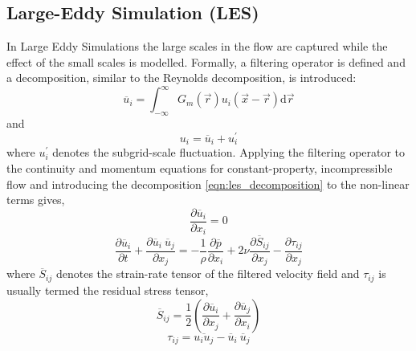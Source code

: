 \subsection{Large-Eddy Simulation (LES)}\label{sec:LES}
In Large Eddy Simulations the large scales in the flow are captured while the effect of the small scales
is modelled. Formally, a filtering operator is defined and a decomposition, similar to the Reynolds
decomposition, is introduced:
\begin{equation}
\overline{u}_i = \int_{-\infty}^\infty G_m\left( \overrightarrow{r} \right) u_i \left( \overrightarrow{x} - \overrightarrow{r} \right) \text{d} \overrightarrow{r}
\label{eqn:les_filtering}
\end{equation}
and
\begin{equation}
u_i = \overline{u}_i + u_i^\prime
\label{eqn:les_decomposition}
\end{equation}
where $u_i^\prime$ denotes the subgrid-scale fluctuation. Applying
the filtering operator to the continuity and momentum equations for constant-property, incompressible
flow and introducing the decomposition \eqref{eqn:les_decomposition} to the non-linear terms gives,
\begin{equation}
\frac{\partial \overline{u}_i}{\partial x_i} = 0
\label{eqn:filtered_continuity}
\end{equation}
\begin{equation}
\frac{\partial \overline{u}_i}{\partial t} + \frac{\partial \overline{u}_i \ \overline{u}_j}{\partial x_j} =
 -\frac 1 \rho \frac{\partial \overline{p}}{\partial x_i}
 + 2 \nu \frac{\partial \overline{S}_{ij}}{\partial x_j} - \frac{\partial \tau_{ij}}{\partial x_j}
\label{eqn:filtered_momentum}
\end{equation}
where $\overline{S}_{ij}$ denotes the strain-rate tensor of the filtered velocity field
and $\tau_{ij}$ is usually termed the residual stress tensor,
\begin{equation}
\overline{S}_{ij} = \frac 1 2 \left ( \frac{\partial \overline{u}_i}{\partial x_j} + \frac{\partial \overline{u}_j}{\partial x_i} \right )
\label{eqn:defin_strain_rate_tensor}
\end{equation}
\begin{equation}
\tau_{ij} = \overline{u_i u_j} - \overline{u}_i \ \overline{u}_j
\label{eqn:defin_sgs_stress_tensor}
\end{equation}
\par
